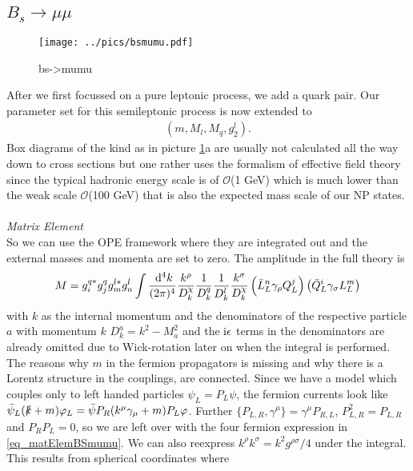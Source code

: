 \subsection{$B_s\rightarrow \mu\mu$}
\label{sec_bsmumu}
\begin{figure}[t]
 \texttt{[image: ../pics/bsmumu.pdf]}
 \caption{bs->mumu}
 \label{pic_Bsmumu}
\end{figure}
After we first focussed on a pure leptonic process, we add a quark pair. Our parameter set for this semileptonic process is now extended to
\begin{align}
 \left(m, M_l, M_q, g_2^l\right).
\end{align}
Box diagrams of the kind as in picture \ref{pic_Bsmumu}a are usually not calculated 
all the way down to cross sections but one rather uses the formalism of effective field theory since the typical hadronic energy scale is of
$\mathcal{O}$(1 GeV) which is much lower than the weak scale $\mathcal{O}$(100 GeV) that is also the expected mass scale of our NP states. 
\\ \\ \noindent \textit{Matrix Element}\\
\noindent So we can use 
the OPE framework where they are integrated out and the external masses and momenta are set to zero. The amplitude in the full theory is
\begin{align}
 M =g_i^{q*} g_j^{q} g_m^{l*} g_n^l\int \frac{\; \mathrm{d}^4 k}{(2\pi)^4} \frac{k^\rho}{D^\chi_k}\frac{1}{D^q_k} \frac{1}{D^l_k} \frac{k^\sigma}{D^\chi_k} \left(\bar L_L^n \gamma_\rho Q_L^j\right) \left(\bar Q_L^i \gamma_\sigma L_L^m\right)
 \label{eq_matElemBSmumu}
\end{align}
with $k$ as the internal momentum and the denominators of the respective particle $a$ with momentum $k$ $D^a_k = k^2-M_a^2$ and the $\text{i}\epsilon$ terms in the denominators are already omitted
due to Wick-rotation later on when the integral is performed. The reasons why $m$ in the fermion propagators is missing
and why there is a Lorentz structure in the couplings, are connected. Since we have a model which couples only to left handed particles $\psi_L = P_L \psi$,
the fermion currents look like $\bar \psi_L (\slashed{k}+m)\varphi_L = \bar \psi P_R (k^\mu \gamma_\mu+m) P_L\varphi$. Further
$\{P_{L,R},\gamma^\mu\} = \gamma^\mu P_{R,L}$, $P_{L,R}^2 = P_{L,R}$ and $P_R P_L = 0$, so we are left over with the four fermion expression in 
\eqref{eq_matElemBSmumu}. We can also reexpress $k^\rho k^\sigma = k^2 g^{\rho\sigma}/4$ under the integral. This results from spherical coordinates where
